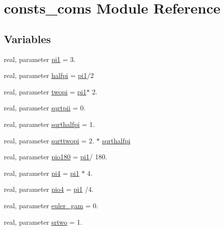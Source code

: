 \hypertarget{namespaceconsts__coms}{}\section{consts\+\_\+coms Module Reference}
\label{namespaceconsts__coms}
\subsection*{Variables}
\begin{DoxyCompactItemize}
\item 
real, parameter \hyperlink{namespaceconsts__coms_ae7b07ddab326c63b9c81a9c607cb79f8}{pi1} = 3.
\item 
real, parameter \hyperlink{namespaceconsts__coms_abbda065eaf0f93e7f1f973705faf75ea}{halfpi} = \hyperlink{namespaceconsts__coms_ae7b07ddab326c63b9c81a9c607cb79f8}{pi1}/2
\item 
real, parameter \hyperlink{namespaceconsts__coms_a1e788efd80b24feef7cf49effb1c3106}{twopi} = \hyperlink{namespaceconsts__coms_ae7b07ddab326c63b9c81a9c607cb79f8}{pi1}$\ast$ 2.
\item 
real, parameter \hyperlink{namespaceconsts__coms_a7ccaba833293a307822d6d2e4e58b992}{sqrtpii} = 0.
\item 
real, parameter \hyperlink{namespaceconsts__coms_a8b1886af4e49f971a141bf7eeb315fa6}{sqrthalfpi} = 1.
\item 
real, parameter \hyperlink{namespaceconsts__coms_a7a26b6224c394bb825fefb5da925c95b}{sqrttwopi} = 2. $\ast$ \hyperlink{namespaceconsts__coms_a8b1886af4e49f971a141bf7eeb315fa6}{sqrthalfpi}
\item 
real, parameter \hyperlink{namespaceconsts__coms_a42c7511eb2987c443fbfb41d92142b8f}{pio180} = \hyperlink{namespaceconsts__coms_ae7b07ddab326c63b9c81a9c607cb79f8}{pi1}/ 180.
\item 
real, parameter \hyperlink{namespaceconsts__coms_a9ab90617058485a809d50b5bf043eda4}{pi4} = \hyperlink{namespaceconsts__coms_ae7b07ddab326c63b9c81a9c607cb79f8}{pi1} $\ast$ 4.
\item 
real, parameter \hyperlink{namespaceconsts__coms_a54e6b465d8b81b90409f351986d2a4de}{pio4} = \hyperlink{namespaceconsts__coms_ae7b07ddab326c63b9c81a9c607cb79f8}{pi1} /4.
\item 
real, parameter \hyperlink{namespaceconsts__coms_aba6e0fb8ee2b35386bc108bca41f91d4}{euler\+\_\+gam} = 0.
\item 
real, parameter \hyperlink{namespaceconsts__coms_ad2093037aef885081f727f22fe6b2554}{srtwo} = 1.

\end{DoxyCompactItemize}
